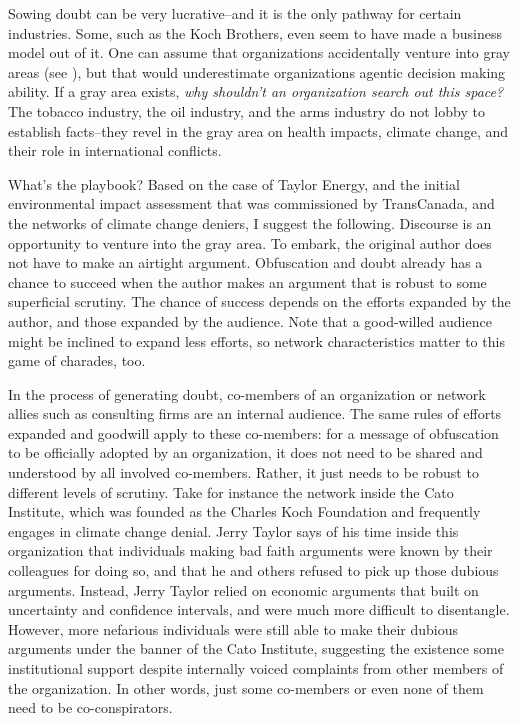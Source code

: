 Sowing doubt can be very lucrative--and it is the only pathway for certain industries. Some, such as the Koch Brothers, even seem to have made a business model out of it. One can assume that organizations accidentally venture into gray areas (see ), but that would underestimate organizations agentic decision making ability. If a gray area exists, \textit{why shouldn't an organization search out this space?} The tobacco industry, the oil industry, and the arms industry do not lobby to establish facts--they revel in the gray area on health impacts, climate change, and their role in international conflicts.

What's the playbook? Based on the case of Taylor Energy, and the initial environmental impact assessment that was commissioned by TransCanada, and the networks of climate change deniers, I suggest the following. Discourse is an opportunity to venture into the gray area. To embark, the original author does not have to make an airtight argument. Obfuscation and doubt already has a chance to succeed when the author makes an argument that is robust to some superficial scrutiny. The chance of success depends on the efforts expanded by the author, and those expanded by the audience. Note that a good-willed audience might be inclined to expand less efforts, so network characteristics matter to this game of charades, too.

In the process of generating doubt, co-members of an organization or network allies such as consulting firms are an internal audience. The same rules of efforts expanded and goodwill apply to these co-members: for a message of obfuscation to be officially adopted by an organization, it does not need to be shared and understood by all involved co-members. Rather, it just needs to be robust to different levels of scrutiny. Take for instance the network inside the Cato Institute, which was founded as the Charles Koch Foundation and frequently engages in climate change denial. Jerry Taylor says of his time inside this organization that individuals making bad faith arguments were known by their colleagues for doing so, and that he and others refused to pick up those dubious arguments. Instead, Jerry Taylor relied on economic arguments that built on uncertainty and confidence intervals, and were much more difficult to disentangle. However, more nefarious individuals were still able to make their dubious arguments under the banner of the Cato Institute, suggesting the existence some institutional support despite internally voiced complaints from other members of the organization. In other words, just some co-members or even none of them need to be co-conspirators.


